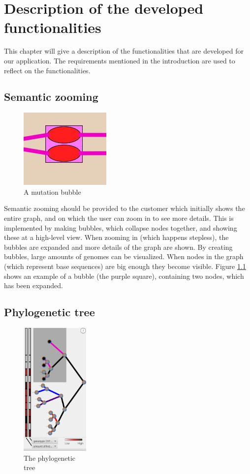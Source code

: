
\chapter{Description of the developed functionalities}
This chapter will give a description of the functionalities that are developed for our application. The requirements mentioned in the introduction are used to reflect on the functionalities.
\section{Semantic zooming}
\begin{figure}
	\centering
	\vspace*{-2.7cm} %
	\includegraphics{images/mutation.jpg}
	\caption{\label{fig:bubble}A mutation bubble}
\end{figure}
Semantic zooming should be provided to the customer which initially shows the entire graph, and on which the user can zoom in to see more details. This is implemented by making bubbles, which collapse nodes together, and showing these at a high-level view. When zooming in (which happens stepless), the bubbles are expanded and more details of the graph are shown. By creating bubbles, large amounts of genomes can be visualized. When nodes in the graph (which represent base sequences) are big enough they become visible. Figure \ref{fig:bubble} shows an example of a bubble (the purple square), containing two nodes, which has been expanded. 

\section{Phylogenetic tree}

\begin{figure}
	\centering
	\vspace*{-3.6cm} %
	\includegraphics[width=0.3\textwidth]{images/tree.jpg}
	\caption{\label{fig:tree}The phylogenetic\\tree}
\end{figure}

